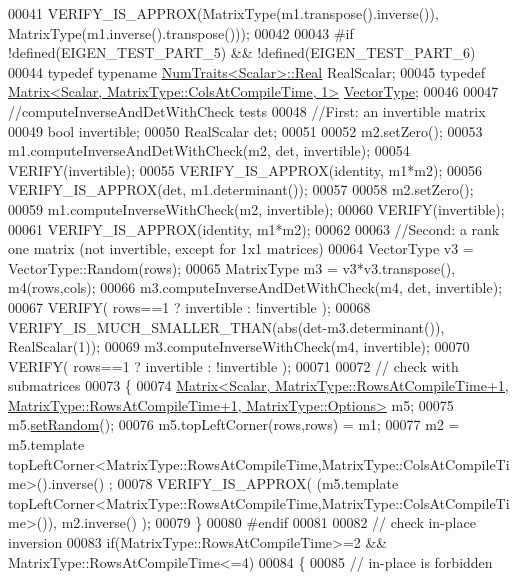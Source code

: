 \begin{DoxyCode}
00041   VERIFY\_IS\_APPROX(MatrixType(m1.transpose().inverse()), MatrixType(m1.inverse().transpose()));
00042 
00043 \textcolor{preprocessor}{#if !defined(EIGEN\_TEST\_PART\_5) && !defined(EIGEN\_TEST\_PART\_6)}
00044   \textcolor{keyword}{typedef} \textcolor{keyword}{typename} \hyperlink{group___core___module_struct_eigen_1_1_num_traits}{NumTraits<Scalar>::Real} RealScalar;
00045   \textcolor{keyword}{typedef} \hyperlink{group___core___module_class_eigen_1_1_matrix}{Matrix<Scalar, MatrixType::ColsAtCompileTime, 1>} 
      \hyperlink{struct_vector_type}{VectorType};
00046   
00047   \textcolor{comment}{//computeInverseAndDetWithCheck tests}
00048   \textcolor{comment}{//First: an invertible matrix}
00049   \textcolor{keywordtype}{bool} invertible;
00050   RealScalar det;
00051 
00052   m2.setZero();
00053   m1.computeInverseAndDetWithCheck(m2, det, invertible);
00054   VERIFY(invertible);
00055   VERIFY\_IS\_APPROX(identity, m1*m2);
00056   VERIFY\_IS\_APPROX(det, m1.determinant());
00057 
00058   m2.setZero();
00059   m1.computeInverseWithCheck(m2, invertible);
00060   VERIFY(invertible);
00061   VERIFY\_IS\_APPROX(identity, m1*m2);
00062 
00063   \textcolor{comment}{//Second: a rank one matrix (not invertible, except for 1x1 matrices)}
00064   VectorType v3 = VectorType::Random(rows);
00065   MatrixType m3 = v3*v3.transpose(), m4(rows,cols);
00066   m3.computeInverseAndDetWithCheck(m4, det, invertible);
00067   VERIFY( rows==1 ? invertible : !invertible );
00068   VERIFY\_IS\_MUCH\_SMALLER\_THAN(abs(det-m3.determinant()), RealScalar(1));
00069   m3.computeInverseWithCheck(m4, invertible);
00070   VERIFY( rows==1 ? invertible : !invertible );
00071   
00072   \textcolor{comment}{// check with submatrices}
00073   \{
00074     
      \hyperlink{group___core___module_class_eigen_1_1_matrix}{Matrix<Scalar, MatrixType::RowsAtCompileTime+1, MatrixType::RowsAtCompileTime+1, MatrixType::Options>}
       m5;
00075     m5.\hyperlink{class_eigen_1_1_plain_object_base_af0e576a0e1aefc9ee346de44cc352ba3}{setRandom}();
00076     m5.topLeftCorner(rows,rows) = m1;
00077     m2 = m5.template topLeftCorner<MatrixType::RowsAtCompileTime,MatrixType::ColsAtCompileTime>().inverse()
      ;
00078     VERIFY\_IS\_APPROX( (m5.template 
      topLeftCorner<MatrixType::RowsAtCompileTime,MatrixType::ColsAtCompileTime>()), m2.inverse() );
00079   \}
00080 \textcolor{preprocessor}{#endif}
00081 
00082   \textcolor{comment}{// check in-place inversion}
00083   \textcolor{keywordflow}{if}(MatrixType::RowsAtCompileTime>=2 && MatrixType::RowsAtCompileTime<=4)
00084   \{
00085     \textcolor{comment}{// in-place is forbidden}

\end{DoxyCode}
